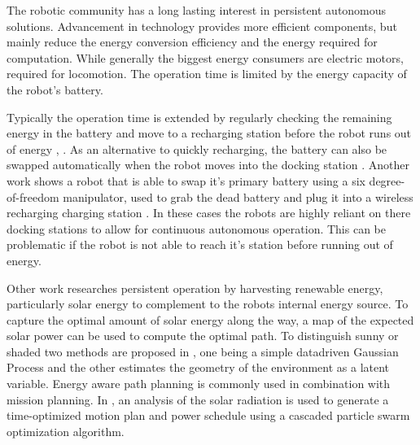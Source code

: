 \documentclass[letterpaper, 10 pt, conference]{ieeeconf}  %
\begin{document}

The robotic community has a long lasting interest in persistent autonomous solutions.
Advancement in technology provides more efficient components, but mainly reduce the energy conversion efficiency and the energy required for computation.
While generally the biggest energy consumers are electric motors, required for locomotion.
The operation time is limited by the energy capacity of the robot's battery.


Typically the operation time is extended by regularly checking the remaining energy in the battery and move to a recharging station before the robot runs out of energy \cite{pickem_icra_2015}, \cite{rubenstein_icra_2012}.
As an alternative to quickly recharging, the battery can also be swapped automatically when the robot moves into the docking station \cite{kemal_mech_2015}.
Another work shows a robot that is able to swap it's primary battery using a six degree-of-freedom manipulator, used to grab the dead battery and plug it into a wireless recharging charging station \cite{zhang_conel_2013}.
In these cases the robots are highly reliant on there docking stations to allow for continuous autonomous operation.
This can be problematic if the robot is not able to reach it's station before running out of energy.



Other work researches persistent operation by harvesting renewable energy, particularly solar energy to complement to the robots internal energy source.
To capture the optimal amount of solar energy along the way, a map of the expected solar power can be used to compute the optimal path. To distinguish sunny or shaded two methods are proposed in \cite{plonski_transro_2016}, one being a simple datadriven Gaussian Process and the other estimates the geometry of the environment as a latent variable.
Energy aware path planning is commonly used in combination with mission planning.
In \cite{kaplan_icra_2016}, an analysis of the solar radiation is used to generate a time-optimized motion plan and power schedule using a cascaded particle swarm optimization algorithm.
\end{document}
